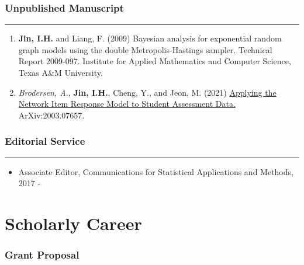 \documentclass[]{book}
\providecommand{\tightlist}{%
  \setlength{\itemsep}{0pt}\setlength{\parskip}{0pt}}
\begin{document}
\hypertarget{unpublished-manuscript}{%
\subsubsection*{Unpublished Manuscript}\label{unpublished-manuscript}}

\begin{center}\rule{0.5\linewidth}{0.5pt}\end{center}

\begin{enumerate}
\def\labelenumi{\arabic{enumi}.}
\item
  \textbf{Jin, I.H.} and Liang, F. (2009) Bayesian analysis for exponential random graph models using the double Metropolis-Hastings sampler. Technical Report 2009-097. Institute for Applied Mathematics and Computer Science, Texas A\&M University.
\item
  \emph{Brodersen, A.}, \textbf{Jin, I.H.}, Cheng, Y., and Jeon, M. (2021) \href{https://arxiv.org/abs/2003.07657}{Applying the Network Item Response Model to Student Assessment Data.} ArXiv:2003.07657.
\end{enumerate}

\hypertarget{editorial-service}{%
\subsubsection*{Editorial Service}\label{editorial-service}}

\begin{center}\rule{0.5\linewidth}{0.5pt}\end{center}

\begin{itemize}
\tightlist
\item
  Associate Editor, Communications for Statistical Applications and Methods, 2017 -
\end{itemize}

\hypertarget{scholarly-career}{%
\section*{Scholarly Career}\label{scholarly-career}}

\hypertarget{grant-proposal}{%
\subsubsection*{Grant Proposal}\label{grant-proposal}}
\end{document}
